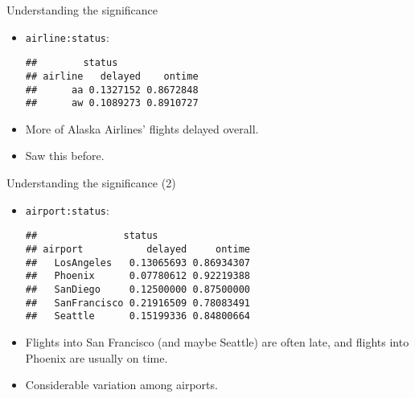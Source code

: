 \begin{frame}[fragile]{Understanding the significance}
  
  \begin{itemize}
  \item \texttt{airline:status}:
\begin{knitrout}
\color{fgcolor}\begin{kframe}
\begin{alltt}
\hlkwb{=}\hlopt{~}\hlopt{+}
 \hlstd{=}\hlstd{)}
\end{alltt}
\begin{verbatim}
##        status
## airline   delayed    ontime
##      aa 0.1327152 0.8672848
##      aw 0.1089273 0.8910727
\end{verbatim}
\end{kframe}
\end{knitrout}
\item More of Alaska Airlines' flights delayed overall.
\item Saw this before.
  \end{itemize}
  
\end{frame}

\begin{frame}[fragile]{Understanding the significance (2)}
  
  \begin{itemize}
  \item \texttt{airport:status}:
\begin{knitrout}
\color{fgcolor}\begin{kframe}
\begin{alltt}
\hlkwb{=}\hlopt{~}\hlopt{+}
\hlstd{=}\hlstd{)}
\end{alltt}
\begin{verbatim}
##               status
## airport           delayed     ontime
##   LosAngeles   0.13065693 0.86934307
##   Phoenix      0.07780612 0.92219388
##   SanDiego     0.12500000 0.87500000
##   SanFrancisco 0.21916509 0.78083491
##   Seattle      0.15199336 0.84800664
\end{verbatim}
\end{kframe}
\end{knitrout}
\item Flights into San Francisco (and maybe Seattle) are often late, and
  flights into Phoenix are usually on time.
\item Considerable variation among airports.
  \end{itemize}
  
\end{frame}

